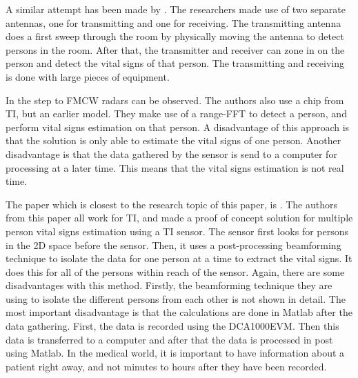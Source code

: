 A similar attempt has been made by \cite{yang2016monitoring}. The researchers made use of two separate antennas, one for transmitting and one for receiving. The transmitting antenna does a first sweep through the room by physically moving the antenna to detect persons in the room. After that, the transmitter and receiver can zone in on the person and detect the vital signs of that person. The transmitting and receiving is done with large pieces of equipment. 

In \cite{alizadeh2019remote} the step to FMCW radars can be observed. The authors also use a chip from TI, but an earlier model. They make use of a range-FFT to detect a person, and perform vital signs estimation on that person. A disadvantage of this approach is that the solution is only able to estimate the vital signs of one person. Another disadvantage is that the data gathered by the sensor is send to a computer for processing at a later time. This means that the vital signs estimation is not real time. 

The paper which is closest to the research topic of this paper, is \cite{ahmad2018vital}. The authors from this paper all work for TI, and made a proof of concept solution for multiple person vital signs estimation using a TI sensor. The sensor first looks for persons in the 2D space before the sensor. Then, it uses a post-processing beamforming technique to isolate the data for one person at a time to extract the vital signs. It does this for all of the persons within reach of the sensor. Again, there are some disadvantages with this method. Firstly, the beamforming technique they are using to isolate the different persons from each other is not shown in detail. The most important disadvantage is that the calculations are done in Matlab after the data gathering. First, the data is recorded using the DCA1000EVM. Then this data is transferred to a computer and after that the data is processed in post using Matlab. In the medical world, it is important to have information about a patient right away, and not minutes to hours after they have been recorded. 